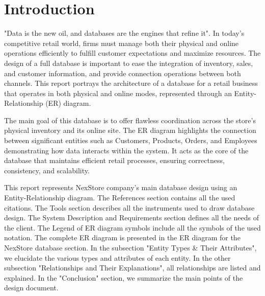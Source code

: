 \section{Introduction}

"Data is the new oil, and databases are the engines that refine it". In today's competitive retail world, firms must manage both their physical and online operations efficiently to fulfill customer expectations and maximize resources. The design of a full database is important to ease the integration of inventory, sales, and customer information, and provide connection operations between both channels. This report portrays the architecture of a database for a retail business that operates in both physical and online modes, represented through an Entity-Relationship (ER) diagram.

The main goal of this database is to offer flawless coordination across the store's physical inventory and its online site. The ER diagram highlights the connection between significant entities such as Customers, Products, Orders, and Employees demonstrating how data interacts within the system. It acts as the core of the database that maintains efficient retail processes, ensuring correctness, consistency, and scalability.

This report represents NexStore company's main database design using an Entity-Relationship diagram. The References section contains all the used citations. The Tools section describes all the instruments used to draw database design. The System Description and Requirements section defines all the needs of the client. The Legend of ER diagram symbols include all the symbols of the used notation. The complete ER diagram is presented in the ER diagram for the NexStore database section. In the subsection "Entity Types \& Their Attributes", we elucidate the various types and attributes of each entity. In the other subsection "Relationships and Their Explanations", all relationships are listed and explained. In the "Conclusion" section, we summarize the main points of the design document.
